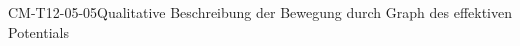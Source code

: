 
\begin{CONC}{CM-T12-05-05}{Qualitative Beschreibung der Bewegung durch Graph des effektiven Potentials}
\end{CONC}
